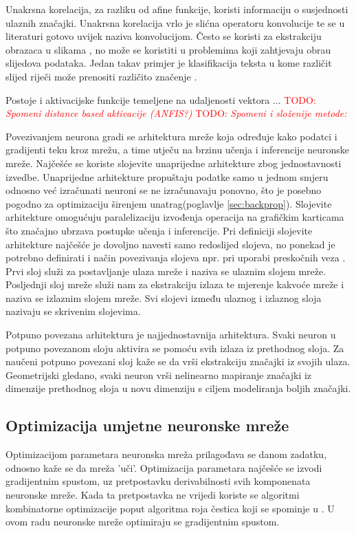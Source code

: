 \documentclass[times, utf8, numeric, diplomski]{fer}
\def\secref#1{(poglavlje \ref{#1})}
\def\TODO#1{\noindent\textcolor{red}{TODO: \textit{#1}}\newline}
\def\todo#1{\TODO{#1}}
\begin{document}
Unakrsna korelacija, za razliku od afine funkcije, koristi informaciju o susjednosti ulaznih značajki. Unakrsna korelacija vrlo je slićna operatoru konvolucije te se u literaturi gotovo uvijek naziva konvolucijom. Često se koristi za ekstrakciju obrazaca u slikama \citep{alexnet}, no može se koristiti u problemima koji zahtjevaju obrau slijedova podataka. Jedan takav primjer je klasifikacija teksta u kome različit slijed riječi može prenositi različito značenje \citep{char_cnn}.

Postoje i aktivacijske funkcije temeljene na udaljenosti vektora ...
\todo{Spomeni distance based aktivacije (ANFIS?)}
\todo{Spomeni i složenije metode: \citep{network_in_network}}

Povezivanjem neurona gradi se arhitektura mreže koja određuje kako podatci i gradijenti teku kroz mrežu, a time utječu na brzinu učenja i inferencije neuronske mreže. Najčešće se koriste slojevite unaprijedne arhitekture zbog jednostavnosti izvedbe. Unaprijedne arhitekture propuštaju podatke samo u jednom smjeru odnosno već izračunati neuroni se ne izračunavaju ponovno, što je posebno pogodno za optimizaciju širenjem unatrag\secref{sec:backprop}. Slojevite arhitekture omogućuju paralelizaciju izvođenja operacija na grafičkim karticama što značajno ubrzava postupke učenja i inferencije. Pri definiciji slojevite arhitekture najčešće je dovoljno navesti samo redoslijed slojeva, no ponekad je potrebno definirati i način povezivanja slojeva npr. pri uporabi preskočnih veza \citep{highwaynet, resnet, densenet}. Prvi sloj služi za postavljanje ulaza mreže i naziva se ulaznim slojem mreže. Posljednji sloj mreže služi nam za ekstrakciju izlaza te mjerenje kakvoće mreže i naziva se izlaznim slojem mreže. Svi slojevi između ulaznog i izlaznog sloja nazivaju se skrivenim slojevima.

Potpuno povezana arhitektura je najjednostavnija arhitektura. Svaki neuron u potpuno povezanom sloju aktivira se pomoću svih izlaza iz prethodnog sloja. Za naučeni potpuno povezani sloj kaže se da vrši ekstrakciju značajki iz svojih ulaza. Geometrijski gledano, svaki neuron vrši nelinearno mapiranje značajki iz dimenzije prethodnog sloja u novu dimenziju s ciljem modeliranja boljih značajki.

\subsection{Optimizacija umjetne neuronske mreže}
Optimizacijom parametara neuronska mreža prilagođava se danom zadatku, odnosno kaže se da mreža 'uči'. Optimizacija parametara najčešće se izvodi gradijentnim spustom, uz pretpostavku derivabilnosti svih komponenata neuronske mreže. Kada ta pretpostavka ne vrijedi koriste se algoritmi kombinatorne optimizacije poput algoritma roja čestica koji se spominje u \citet{skripta_nenr}. U ovom radu neuronske mreže optimiraju se gradijentnim spustom.
\end{document}
